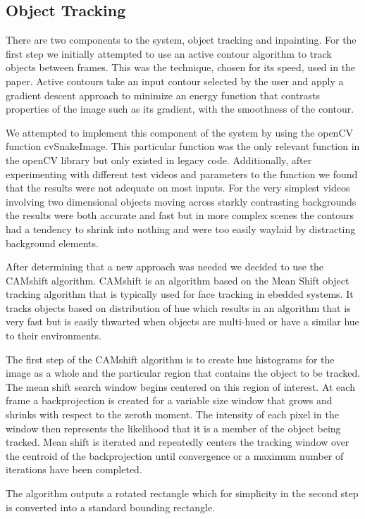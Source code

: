 \documentclass[12pt]{article}
\begin{document}
\subsection{Object Tracking}
There are two components to the system, object tracking and inpainting. For the first step we initially attempted to use an active contour algorithm to track objects between frames. This was the technique, chosen for its speed, used in the paper. Active contours take an input contour selected by the user and apply a gradient descent approach to minimize an energy function that contrasts properties of the image such as its gradient, with the smoothness of the contour. 

We attempted to implement this component of the system by using the openCV function cvSnakeImage. This particular function was the only relevant function in the openCV library but only existed in legacy code. Additionally, after experimenting with different test videos and parameters to the function we found that the results were not adequate on most inputs. For the very simplest videos involving two dimensional objects moving across starkly contrasting backgrounds the results were both accurate and fast but in more complex scenes the contours had a tendency to shrink into nothing and were too easily waylaid by distracting background elements. 

After determining that a new approach was needed we decided to use the CAMshift algorithm. CAMshift is an algorithm based on the Mean Shift object tracking algorithm that is typically used for face tracking in ebedded systems. It tracks objects based on distribution of hue which results in an algorithm that is very fast but is easily thwarted when objects are multi-hued or have a similar hue to their environments.

The first step of the CAMshift algorithm is to create hue histograms for the image as a whole and the particular region that contains the object to be tracked. The mean shift search window begins centered on this region of interest. At each frame a backprojection is created for a variable size window that grows and shrinks with respect to the zeroth moment. The intensity of each pixel in the window then represents the likelihood that it is a member of the object being tracked. Mean shift is iterated and repeatedly centers the tracking window over the centroid of the backprojection until convergence or a maximum number of iterations have been completed. 

The algorithm outputs a rotated rectangle which for simplicity in the second step is converted into a standard bounding rectangle. 
\end{document}
